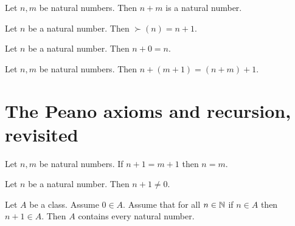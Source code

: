 \documentclass[../arithmetic.tex]{subfiles}
\begin{document}
  \begin{forthel}
    \begin{lemma}
      Let $n, m$ be natural numbers.
      Then $n + m$ is a natural number.
    \end{lemma}
  \end{forthel}

  \begin{forthel}
    \begin{lemma}
      Let $n$ be a natural number.
      Then $\succ(n) = n + 1$.
    \end{lemma}
  \end{forthel}

  \begin{forthel}
    \begin{lemma}
      Let $n$ be a natural number.
      Then $n + 0 = n$.
    \end{lemma}
  \end{forthel}

  \begin{forthel}
    \begin{lemma}
      Let $n, m$ be natural numbers.
      Then $n + (m + 1) = (n + m) + 1$.
    \end{lemma}
  \end{forthel}


  \section{The Peano axioms and recursion, revisited}

  \begin{forthel}
    \begin{proposition}
      Let $n, m$ be natural numbers.
      If $n + 1 = m + 1$ then $n = m$.
    \end{proposition}
  \end{forthel}

  \begin{forthel}
    \begin{proposition}
      Let $n$ be a natural number.
      Then $n + 1 \neq 0$.
    \end{proposition}
  \end{forthel}

  \begin{forthel}
    \begin{proposition}[Induction]
      Let $A$ be a class.
      Assume $0 \in A$.
      Assume that for all $n \in \mathbb{N}$ if $n \in A$ then $n + 1 \in A$.
      Then $A$ contains every natural number.
    \end{proposition}
  \end{forthel}
\end{document}

